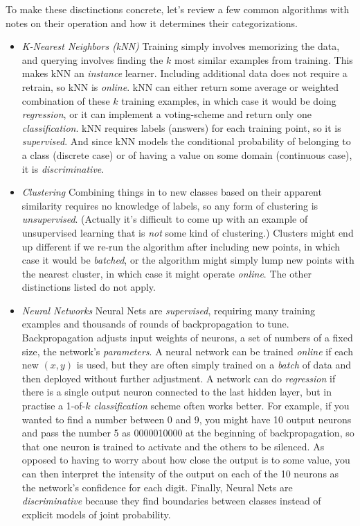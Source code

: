 \documentclass[]{article}
\begin{document}
  To make these disctinctions concrete, let's review a few common algorithms with notes on their operation and how it determines their categorizations.

  \begin{itemize}
    \item \textit{K-Nearest Neighbors (kNN)} Training simply involves memorizing the data, and querying involves finding the $k$ most similar examples from training. This makes kNN an \textit{instance} learner. Including additional data does not require a retrain, so kNN is \textit{online}. kNN can either return some average or weighted combination of these $k$ training examples, in which case it would be doing \textit{regression}, or it can implement a voting-scheme and return only one \textit{classification}. kNN requires labels (answers) for each training point, so it is \textit{supervised}. And since kNN models the conditional probability of belonging to a class (discrete case) or of having a value on some domain (continuous case), it is \textit{discriminative}.
    \item \textit{Clustering} Combining things in to new classes based on their apparent similarity requires no knowledge of labels, so any form of clustering is \textit{unsupervised}. (Actually it's difficult to come up with an example of unsupervised learning that is \textit{not} some kind of clustering.) Clusters might end up different if we re-run the algorithm after including new points, in which case it would be \textit{batched}, or the algorithm might simply lump new points with the nearest cluster, in which case it might operate \textit{online}. The other distinctions listed do not apply.
    \item \textit{Neural Networks} Neural Nets are \textit{supervised}, requiring many training examples and thousands of rounds of backpropagation to tune. Backpropagation adjusts input weights of neurons, a set of numbers of a fixed size, the network's \textit{parameters}. A neural network can be trained \textit{online} if each new $(x,y)$ is used, but they are often simply trained on a \textit{batch} of data and then deployed without further adjustment. A network can do \textit{regression} if there is a single output neuron connected to the last hidden layer, but in practise a 1-of-$k$ \textit{classification} scheme often works better. For example, if you wanted to find a number between 0 and 9, you might have 10 output neurons and pass the number 5 as 0000010000 at the beginning of backpropagation, so that one neuron is trained to activate and the others to be silenced. As opposed to having to worry about how close the output is to some value, you can then interpret the intensity of the output on each of the 10 neurons as the network's confidence for each digit. Finally, Neural Nets are \textit{discriminative} because they find boundaries between classes instead of explicit models of joint probability.
  \end{itemize}
\end{document}
